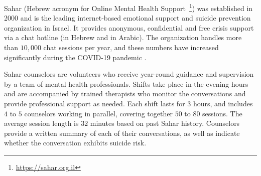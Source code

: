 \documentclass[letterpaper]{article} %
\newcommand{\kibitz}[2]{\ifnum\Comments=1{\textcolor{#1}{#2}}\fi}
\newcommand{\kg}[1]{\kibitz{red}{[KG:#1]}}
\newcommand{\di}[1]{\kibitz{blue}{[DI:#1]}}
\begin{document}

Sahar (Hebrew acronym for Online Mental Health Support~\footnote{\url{https://sahar.org.il}})   was established in 2000 and is the leading internet-based emotional support and suicide prevention organization in Israel. It provides anonymous, confidential and free crisis support via a chat hotline (in Hebrew and in Arabic). The organization handles more than $10,000$ chat sessions per year, and these numbers have increased significantly during the COVID-19 pandemic \cite{zalsman2021suicide}.

Sahar counselors are volunteers who  receive year-round guidance and supervision by a team of mental health professionals.  
Shifts take place in the evening hours and are   accompanied by trained therapists who monitor the conversations and provide professional support as needed. Each shift lasts for 3 hours, and includes $4$ to $5$ counselors working in parallel, covering together $50$ to $80$  sessions. The average session length is $32$ minutes based on past Sahar history.  
Counselors provide a written summary of each of their conversations, as well as  indicate whether the conversation exhibits suicide risk. 

\end{document}
